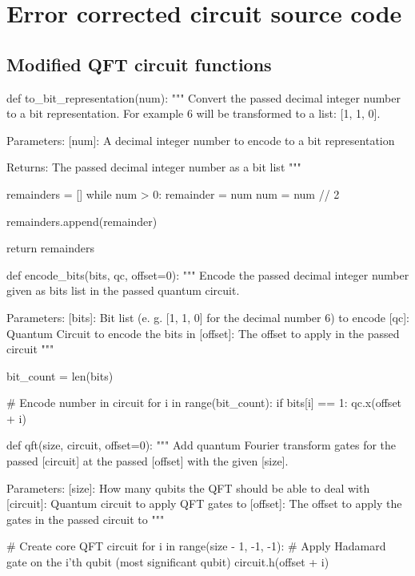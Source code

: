 \section{Error corrected circuit source code}
\label{sec:error-corrected-circuit-appendix}

\subsection{Modified QFT circuit functions}
\label{subsec:modified-qft-circuit-functions}

\begin{python}
def to_bit_representation(num):
    """
    Convert the passed decimal integer number to a bit representation.
    For example 6 will be transformed to a list: [1, 1, 0].

    Parameters:
    [num]: A decimal integer number to encode to a bit representation

    Returns:
    The passed decimal integer number as a bit list
    """

    remainders = []
    while num > 0:
        remainder = num %
        num = num // 2

        remainders.append(remainder)

    return remainders


def encode_bits(bits, qc, offset=0):
    """
    Encode the passed decimal integer number given as bits list in the passed quantum circuit.

    Parameters:
    [bits]: Bit list (e. g. [1, 1, 0] for the decimal number 6) to encode
    [qc]: Quantum Circuit to encode the bits in
    [offset]: The offset to apply in the passed circuit
    """

    bit_count = len(bits)

    # Encode number in circuit
    for i in range(bit_count):
    if bits[i] == 1:
    qc.x(offset + i)


    def qft(size, circuit, offset=0):
    """
    Add quantum Fourier transform gates for the passed [circuit] at the passed [offset]
    with the given [size].

    Parameters:
    [size]: How many qubits the QFT should be able to deal with
    [circuit]: Quantum circuit to apply QFT gates to
    [offset]: The offset to apply the gates in the passed circuit to
    """

    # Create core QFT circuit
    for i in range(size - 1, -1, -1):
        # Apply Hadamard gate on the i'th qubit (most significant qubit)
        circuit.h(offset + i)


\end{python}
